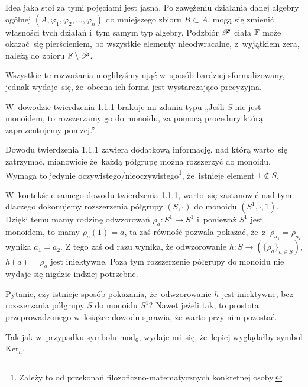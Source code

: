 \documentclass[a4paper,11pt]{article}
\begin{document}
Idea jaka stoi za tymi pojęciami jest jasna. Po zawężeniu działania danej
algebry ogólnej $( A, \varphi_{ 1 }, \varphi_{ 2 }, \ldots, \varphi_{ n } )$ do mniejszego zbioru
$B \subset A$, mogą się zmienić własności tych działań i~tym samym typ algebry.
Podzbiór $\mathcal{P}$ ciała $\mathbb{F}$ może okazać~się pierścieniem, bo wszystkie
elementy nieodwracalne, z~wyjątkiem zera, należą do zbioru $\mathbb{F} \setminus \mathcal{P}$.

Wszystkie te rozważania moglibyśmy ująć w~sposób bardziej sformalizowany,
jednak wydaje~się, że~obecna ich forma jest wystarczająco precyzyjna.

\vspace{\spaceFour}



\start {} W~dowodzie twierdzenia 1.1.1 brakuje mi zdania typu
„Jeśli $S$ nie jest monoidem, to rozszerzamy go do monoidu, za pomocą
procedury którą zaprezentujemy poniżej.”.

\vspace{\spaceFour}



\start {} Dowodu twierdzenia 1.1.1 zawiera dodatkową informację,
nad którą warto~się zatrzymać, mianowicie że~każdą półgrupę można
rozszerzyć do monoidu. Wymaga to jedynie
oczywistego/nieoczywistego\footnote{Zależy to od przekonań
  filozoficzno-matematycznych konkretnej osoby.}, że~istnieje element
$1 \notin S$.

W~kontekście samego dowodu twierdzenia 1.1.1, warto~się zastanowić nad
tym dlaczego dokonujemy rozszerzenia półgrupy $( S, \cdot )$ do
monoidu $( S^{ 1 }, \cdot, 1 )$. Dzięki temu mamy rodzinę odwzorowań
$\rho_{ a } : S^{ 1 } \to S^{ 1 }$ i~ponieważ $S^{ 1 }$ jest monoidem,
to mamy $\rho_{ a }( 1 ) = a$, ta zaś równość pozwala pokazać,
że~z~$\rho_{ a_{ 1 } } = \rho_{ a_{ 2 } }$ wynika $a_{ 1 } = a_{ 2 }$.
Z tego zaś od razu wynika, że odwzorowanie
$h : S \to ( \{ \rho_{ a } \}_{ a \in S } )$, $h( a ) = \rho_{ a }$
jest iniektywne. Poza tym rozszerzenie półgrupy do monoidu nie wydaje
się nigdzie indziej potrzebne.

Pytanie, czy istnieje sposób pokazania, że~odwzorowanie $h$ jest
iniektywne, bez rozszerzania półgrupy $S$ do monoidu $S^{ 1 }$? Nawet
jeżeli tak, to prostota przeprowadzonego w~książce dowodu sprawia, że
warto przy nim pozostać.

\vspace{\spaceFour}



\start {} Tak jak w~przypadku symbolu $\textrm{mod}_{ 6 }$,
wydaje mi~się, że~lepiej wyglądałby symbol $\textrm{Ker}_{ h }$.
\end{document}

